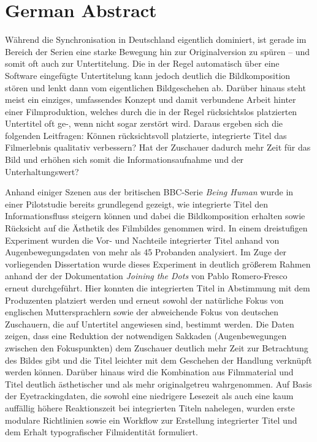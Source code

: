 \section{German Abstract}

Während die Synchronisation in Deutschland eigentlich dominiert, ist gerade im Bereich der Serien eine starke Bewegung hin zur Originalversion zu spüren – und somit oft auch zur Untertitelung. Die in der Regel automatisch über eine Software eingefügte Untertitelung kann jedoch deutlich die Bildkomposition stören und lenkt dann vom eigentlichen Bildgeschehen ab. Darüber hinaus steht meist ein einziges, umfassendes Konzept und damit verbundene Arbeit hinter einer Filmproduktion, welches durch die in der Regel rücksichtslos platzierten Untertitel oft ge-, wenn nicht sogar zerstört wird. Daraus ergeben sich die folgenden Leitfragen: Können rücksichtsvoll platzierte, integrierte Titel das Filmerlebnis qualitativ verbessern? Hat der Zuschauer dadurch mehr Zeit für das Bild und erhöhen sich somit die Informationsaufnahme und der Unterhaltungswert?

Anhand einiger Szenen aus der britischen BBC-Serie \textit{Being Human} wurde in einer Pilotstudie \citep{Fox2012} bereits grundlegend gezeigt, wie integrierte Titel den Informationsfluss steigern können und dabei die Bildkomposition erhalten sowie Rücksicht auf die Ästhetik des Filmbildes genommen wird. In einem dreistufigen Experiment wurden die Vor- und Nachteile integrierter Titel anhand von Augenbewegungsdaten von mehr als 45 Probanden analysiert. Im Zuge der vorliegenden Dissertation wurde dieses Experiment in deutlich größerem Rahmen anhand der der Dokumentation \textit{Joining the Dots} von Pablo Romero-Fresco erneut durchgeführt. Hier konnten die integrierten Titel in Abstimmung mit dem Produzenten platziert werden und erneut sowohl der natürliche Fokus von englischen Muttersprachlern sowie der abweichende Fokus von deutschen Zuschauern, die auf Untertitel angewiesen sind, bestimmt werden. Die Daten zeigen, dass eine Reduktion der notwendigen Sakkaden (Augenbewegungen zwischen den Fokuspunkten) dem Zuschauer deutlich mehr Zeit zur Betrachtung des Bildes gibt und die Titel leichter mit dem Geschehen der Handlung verknüpft werden können. Darüber hinaus wird die Kombination aus Filmmaterial und Titel deutlich ästhetischer und als mehr originalgetreu wahrgenommen. Auf Basis der Eyetrackingdaten, die sowohl eine niedrigere Lesezeit als auch eine kaum auffällig höhere Reaktionszeit bei integrierten Titeln nahelegen, wurden erste modulare Richtlinien sowie ein Workflow zur Erstellung integrierter Titel und dem Erhalt typografischer Filmidentität formuliert.
